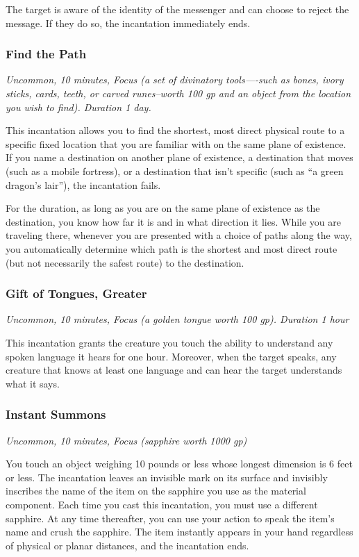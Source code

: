 The target is aware of the identity of the messenger and can choose to reject the message. If they do so, the incantation immediately ends.

\subsubsection{Find the Path}
\textit{Uncommon, 10 minutes, Focus (a set of divinatory tools—-such as bones, ivory sticks, cards, teeth, or carved runes--worth 100 gp and an object from the location you wish to find). Duration 1 day.}

This incantation allows you to find the shortest, most direct physical route to a specific fixed location that you are familiar with on the same plane of existence. If you name a destination on another plane of existence, a destination that moves (such as a mobile fortress), or a destination that isn't specific (such as “a green dragon's lair”), the incantation fails.

For the duration, as long as you are on the same plane of existence as the destination, you know how far it is and in what direction it lies. While you are traveling there, whenever you are presented with a choice of paths along the way, you automatically determine which path is the shortest and most direct route (but not necessarily the safest route) to the destination.

\subsubsection{Gift of Tongues, Greater}
\textit{Uncommon, 10 minutes, Focus (a golden tongue worth 100 gp). Duration 1 hour}

This incantation grants the creature you touch the ability to understand any spoken language it hears for one hour. Moreover, when the target speaks, any creature that knows at least one language and can hear the target understands what it says.

\subsubsection{Instant Summons}
\textit{Uncommon, 10 minutes, Focus (sapphire worth 1000 gp)}

You touch an object weighing 10 pounds or less whose longest dimension is 6 feet or less. The incantation leaves an invisible mark on its surface and invisibly inscribes the name of the item on the sapphire you use as the material component. Each time you cast this incantation, you must use a different sapphire. At any time thereafter, you can use your action to speak the item's name and crush the sapphire. The item instantly appears in your hand regardless of physical or planar distances, and the incantation ends.

